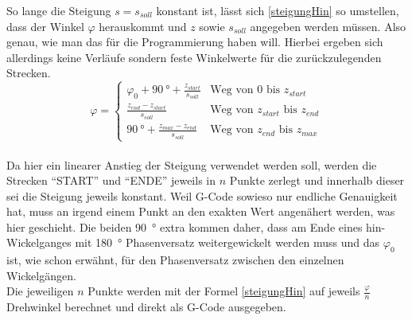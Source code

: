 \documentclass[paper=A4,pagesize,DIV=18, 12pt,listof=totoc,bibliography=totoc,headings=optiontohead,open=any]{article}
\begin{document}
So lange die Steigung $s = s_{soll}$ konstant ist, lässt sich \eqref{steigungHin} so umstellen, dass der Winkel $\varphi$ herauskommt und $z$ sowie $s_{soll}$ angegeben werden müssen. Also genau, wie man das für die Programmierung haben will. Hierbei ergeben sich allerdings keine Verläufe sondern feste Winkelwerte für die zurückzulegenden Strecken.
\begin{equation}\label{GesamtwegeHinRück}
	\varphi =
	\begin{cases}
		\varphi_0 + \SI{90}{\degree} + \frac{z_{start}}{s_{soll}} & \text{Weg von 0 bis $z_{start}$}\\ 
		\frac{z_{end} - z_{start}}{s_{soll}} & \text{Weg von $z_{start}$ bis $z_{end}$}\\
		\SI{90}{\degree} + \frac{z_{max} - z_{end}}{s_{soll}} & \text{Weg von $z_{end}$ bis $z_{max}$}
	\end{cases}	
\end{equation}\\
Da hier ein linearer Anstieg der Steigung verwendet werden soll, werden die Strecken \enquote{START} und \enquote{ENDE} jeweils in $n$ Punkte zerlegt und innerhalb dieser sei die Steigung jeweils konstant. Weil G-Code sowieso nur endliche Genauigkeit hat, muss an irgend einem Punkt an den exakten Wert angenähert werden, was hier geschieht. Die beiden \SI{90}{\degree} extra kommen daher, dass am Ende eines hin-Wickelganges mit \SI{180}{\degree} Phasenversatz weitergewickelt werden muss und das $\varphi_0$ ist, wie schon erwähnt, für den Phasenversatz zwischen den einzelnen Wickelgängen.\\
Die jeweiligen $n$ Punkte werden mit der Formel \eqref{steigungHin} auf jeweils $\frac{\varphi}{n}$ Drehwinkel berechnet und direkt als G-Code ausgegeben.
\end{document}
